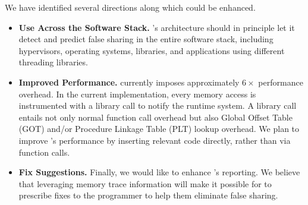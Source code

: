 \label{sec:futurework}

We have identified several directions along which \Predator{} could be enhanced.

\begin{itemize}

\item \textbf{Use Across the Software Stack.} 
\Predator{}'s architecture should in principle let it detect and predict false sharing in the entire software stack, including hypervisors, operating systems, libraries, and applications using different threading libraries.

\item \textbf{Improved Performance.}
\Predator{} currently imposes approximately $6\times$ performance overhead. In the current implementation, every memory access is instrumented with a library call to notify the runtime system. A library call entails not only normal function call overhead but also Global Offset Table (GOT) and/or Procedure Linkage Table (PLT) lookup overhead. We plan to improve \Predator{}'s performance by inserting relevant code directly, rather than via function calls.

\item \textbf{Fix Suggestions.} Finally, we would like to enhance \Predator{}'s reporting. We believe that leveraging memory trace information will make it possible for \Predator{} to prescribe fixes to the programmer to help them eliminate false sharing.
  
\end{itemize}
